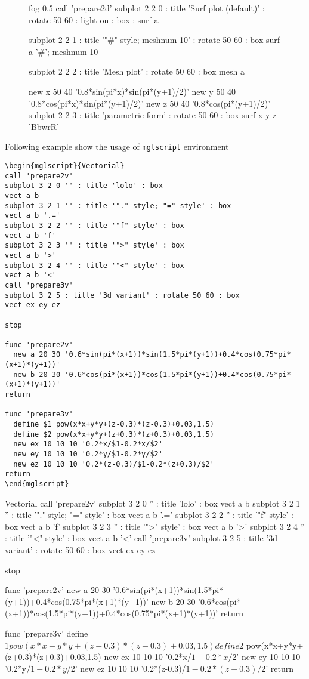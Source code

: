 \documentclass{article}
\begin{document}
\begin{figure}[!ht]
  \centering
  \begin{mgl}[width=0.85\textwidth,height=7.5cm]
    fog 0.5
    call 'prepare2d'
    subplot 2 2 0 : title 'Surf plot (default)' : rotate 50 60 : light on : box : surf a

    subplot 2 2 1 : title '"\#" style; meshnum 10' : rotate 50 60 : box
    surf a '#'; meshnum 10

    subplot 2 2 2 : title 'Mesh plot' : rotate 50 60 : box
    mesh a

    new x 50 40 '0.8*sin(pi*x)*sin(pi*(y+1)/2)'
    new y 50 40 '0.8*cos(pi*x)*sin(pi*(y+1)/2)'
    new z 50 40 '0.8*cos(pi*(y+1)/2)'
    subplot 2 2 3 : title 'parametric form' : rotate 50 60 : box
    surf x y z 'BbwrR'
  \end{mgl}
\end{figure}

Following example show the usage of \texttt{mglscript} environment
\begin{verbatim}
\begin{mglscript}{Vectorial}
call 'prepare2v'
subplot 3 2 0 '' : title 'lolo' : box
vect a b
subplot 3 2 1 '' : title '"." style; "=" style' : box
vect a b '.='
subplot 3 2 2 '' : title '"f" style' : box
vect a b 'f'
subplot 3 2 3 '' : title '">" style' : box
vect a b '>'
subplot 3 2 4 '' : title '"<" style' : box
vect a b '<'
call 'prepare3v'
subplot 3 2 5 : title '3d variant' : rotate 50 60 : box
vect ex ey ez

stop
    
func 'prepare2v'
  new a 20 30 '0.6*sin(pi*(x+1))*sin(1.5*pi*(y+1))+0.4*cos(0.75*pi*(x+1)*(y+1))'
  new b 20 30 '0.6*cos(pi*(x+1))*cos(1.5*pi*(y+1))+0.4*cos(0.75*pi*(x+1)*(y+1))'
return
    
func 'prepare3v'
  define $1 pow(x*x+y*y+(z-0.3)*(z-0.3)+0.03,1.5)
  define $2 pow(x*x+y*y+(z+0.3)*(z+0.3)+0.03,1.5)
  new ex 10 10 10 '0.2*x/$1-0.2*x/$2'
  new ey 10 10 10 '0.2*y/$1-0.2*y/$2'
  new ez 10 10 10 '0.2*(z-0.3)/$1-0.2*(z+0.3)/$2'
return
\end{mglscript}
\end{verbatim}

\begin{mglscript}{Vectorial}
call 'prepare2v'
subplot 3 2 0 '' : title 'lolo' : box
vect a b
subplot 3 2 1 '' : title '"." style; "=" style' : box
vect a b '.='
subplot 3 2 2 '' : title '"f" style' : box
vect a b 'f'
subplot 3 2 3 '' : title '">" style' : box
vect a b '>'
subplot 3 2 4 '' : title '"<" style' : box
vect a b '<'
call 'prepare3v'
subplot 3 2 5 : title '3d variant' : rotate 50 60 : box
vect ex ey ez

stop
    
func 'prepare2v'
  new a 20 30 '0.6*sin(pi*(x+1))*sin(1.5*pi*(y+1))+0.4*cos(0.75*pi*(x+1)*(y+1))'
  new b 20 30 '0.6*cos(pi*(x+1))*cos(1.5*pi*(y+1))+0.4*cos(0.75*pi*(x+1)*(y+1))'
return
    
func 'prepare3v'
  define $1 pow(x*x+y*y+(z-0.3)*(z-0.3)+0.03,1.5)
  define $2 pow(x*x+y*y+(z+0.3)*(z+0.3)+0.03,1.5)
  new ex 10 10 10 '0.2*x/$1-0.2*x/$2'
  new ey 10 10 10 '0.2*y/$1-0.2*y/$2'
  new ez 10 10 10 '0.2*(z-0.3)/$1-0.2*(z+0.3)/$2'
return
\end{mglscript}
\end{document}
